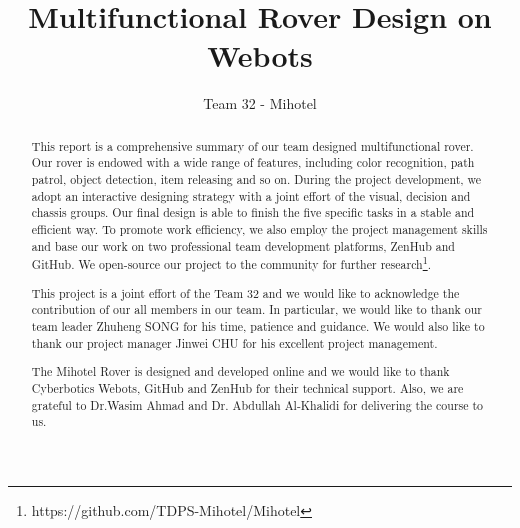 \documentclass[a4paper, twoside]{report}
\title{Multifunctional Rover Design on Webots}
\author{Team 32 - Mihotel}
\begin{document}


\begin{abstract}
This report is a comprehensive summary of our team designed multifunctional rover. Our rover is endowed with a wide range of features, including color recognition, path patrol, object detection, item releasing and so on. During the project development, we adopt an interactive designing strategy with a joint effort of the visual, decision and chassis groups. Our final design is able to finish the five specific tasks in a stable and efficient way. To promote work efficiency, we also employ the project management skills and base our work on two professional team development platforms, ZenHub and GitHub.
We open-source our project to the community for further research\footnote{https://github.com/TDPS-Mihotel/Mihotel}.
\end{abstract}

\renewcommand{\abstractname}{Acknowledgements}
\begin{abstract}

This project is a joint effort of the Team 32 and we would like to acknowledge the contribution of our all members in our team. In particular, we would like to thank our team leader Zhuheng SONG for his time, patience and guidance. We would also like to thank our project manager Jinwei CHU for his excellent project management.

The Mihotel Rover is designed and developed online and we would like to thank Cyberbotics Webots, GitHub and ZenHub for their technical support. Also, we are grateful to Dr.Wasim Ahmad and Dr. Abdullah Al-Khalidi for delivering the course to us.
\end{abstract}

\tableofcontents
\listoffigures
\listoftables











\end{document}
